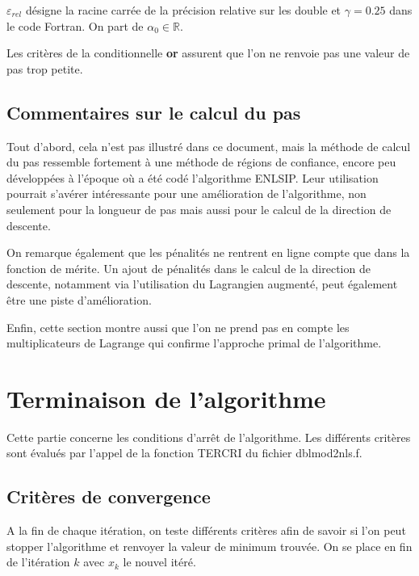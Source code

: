 \documentclass[a4paper,11pt]{article}
\newcommand{\real}{\mathbb{R}}
\numberwithin{equation}{section}
\begin{document}
$\varepsilon_{rel}$ désigne la racine carrée de la précision relative sur les double et $\gamma = 0.25$ dans le code Fortran.
On part de $\alpha_{0} \in \real$.
\begin{algorithmic}
\ENDWHILE
\RETURN{$\alpha$}
\end{algorithmic}

Les critères de la conditionnelle \textbf{or} assurent que l'on ne renvoie pas une valeur de pas trop petite.

\subsection{Commentaires sur le calcul du pas}

Tout d'abord, cela n'est pas illustré dans ce document, mais la méthode de calcul du pas ressemble fortement à une méthode de régions de confiance, encore peu développées à l'époque où a été codé l'algorithme ENLSIP. Leur utilisation pourrait s'avérer intéressante pour une amélioration de l'algorithme, non seulement pour la longueur de pas mais aussi pour le calcul de la direction de descente.  

On remarque également que les pénalités ne rentrent en ligne compte que dans la fonction de mérite. Un ajout de pénalités dans le calcul de la direction de descente, notamment via l'utilisation du Lagrangien augmenté, peut également être une piste d'amélioration.

Enfin, cette section montre aussi que l'on ne prend pas en compte les multiplicateurs de Lagrange qui confirme l'approche primal de l'algorithme.

\section{Terminaison de l'algorithme}

Cette partie concerne les conditions d'arrêt de l'algorithme. Les différents critères sont évalués par l'appel de la fonction  TERCRI du fichier dblmod2nls.f.
\subsection{Critères de convergence}

A la fin de chaque itération, on teste différents critères afin de savoir si l'on peut stopper l'algorithme et renvoyer la valeur de minimum trouvée. On se place en fin de l'itération $k$ avec $x_{k}$ le nouvel itéré.
\end{document}
